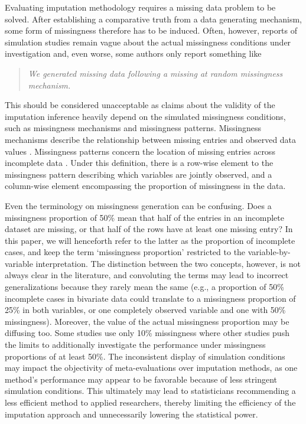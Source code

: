 \documentclass[bimj,fleqn]{w-art}
\begin{document}
Evaluating imputation methodology requires a missing data problem to be solved. After establishing a comparative truth from a data generating mechanism, some form of missingness therefore has to be induced. Often, however, reports of simulation studies remain vague about the actual missingness conditions under investigation and, even worse, some authors only report something like
\begin{quote}
\textit{We generated missing data following a missing at random missingness mechanism.}
\end{quote}
This should be considered unacceptable as claims about the validity of the imputation inference heavily depend on the simulated missingness conditions, such as missingness mechanisms and missingness patterns. Missingness mechanisms describe the relationship between missing entries and observed data values \citep[generally categorized into MCAR, MAR and MNAR mechanisms cf][see Table \ref{table:mech}]{rubi76}.  Missingness patterns concern the location of missing entries across incomplete data \citep[][p. 8]{litt20}. Under this definition, there is a row-wise element to the missingness pattern describing which variables are jointly observed, and a column-wise element encompassing the proportion of missingness in the data. 

Even the terminology on missingness generation can be confusing. Does a missingness proportion of 50\% mean that half of the entries in an incomplete dataset are missing, or that half of the rows have at least one missing entry? In this paper, we will henceforth refer to the latter as the proportion of incomplete cases, and keep the term `missingness proportion' restricted to the variable-by-variable interpretation. The distinction between the two concepts, however, is not always clear in the literature, and convoluting the terms may lead to incorrect generalizations because they rarely mean the same (e.g., a proportion of 50\% incomplete cases in bivariate data could translate to a missingness proportion of 25\% in both variables, or one completely observed variable and one with 50\% missingness). Moreover, the value of the actual missingness proportion may be diffusing too. Some studies use only 10\% missingness where other studies push the limits to additionally investigate the performance under missingness proportions of at least 50\%. The inconsistent display of simulation conditions may impact the objectivity of meta-evaluations over imputation methods, as one method's performance may appear to be favorable because of less stringent simulation conditions. This ultimately may lead to statisticians recommending a less efficient method to applied researchers, thereby limiting the efficiency of the imputation approach and unnecessarily lowering the statistical power.
\end{document}
